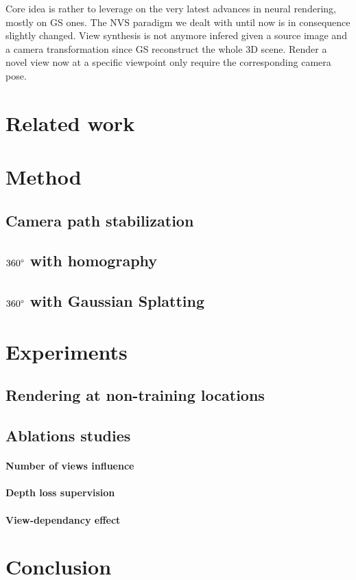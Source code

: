 Core idea is rather to leverage on the very latest advances in neural rendering, mostly on \ac{GS} ones. The \ac{NVS} paradigm we dealt with until now is in consequence slightly changed. View synthesis is not anymore infered given a source image and a camera transformation since \ac{GS} reconstruct the whole 3D scene. Render a novel view now at a specific viewpoint only require the corresponding camera pose. 









\section{Related work}
\section{Method}
\subsection{Camera path stabilization}
\subsection{$360\degree$ with homography}
\subsection{$360\degree$ with Gaussian Splatting}
\section{Experiments}
\subsection{Rendering at non-training locations}

\subsection{Ablations studies}
\paragraph{Number of views influence}
\paragraph{Depth loss supervision}
\paragraph{View-dependancy effect}
\section{Conclusion}
